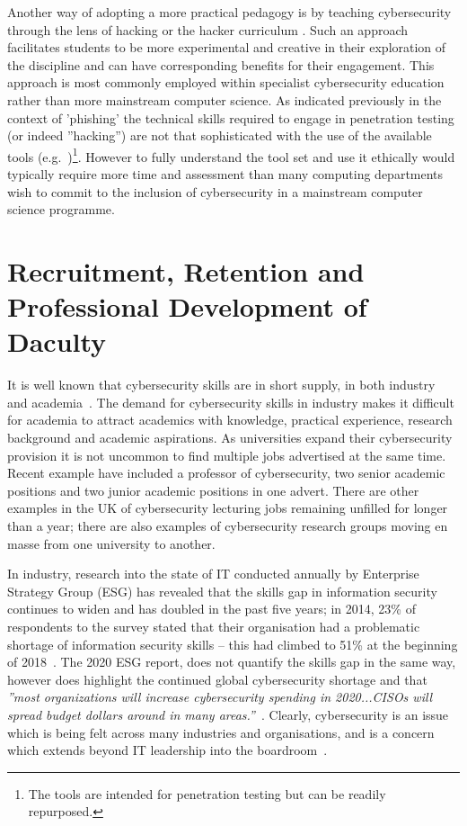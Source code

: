 \documentclass[conference]{IEEEtran}
\begin{document}
Another way of adopting a more practical pedagogy is by teaching
cybersecurity through the lens of hacking or the hacker curriculum
\cite{bratus2010teaching}. Such an approach facilitates students to be
more experimental and creative in their exploration of the discipline
and can have corresponding benefits for their engagement. This
approach is most commonly employed within specialist cybersecurity
education rather than more mainstream computer science. As indicated
previously in the context of 'phishing' the technical skills required
to engage in penetration testing (or indeed ''hacking'') are not that
sophisticated with the use of the available tools
(e.g.~\cite{KaliLinux,metasploit})\footnote{The tools are intended for
penetration testing but can be readily repurposed. }. However to fully
understand the tool set and use it ethically would typically require
more time and assessment than many computing departments wish to
commit to the inclusion of cybersecurity in a mainstream computer
science programme.

\section{Recruitment, Retention and Professional Development of
  Daculty}\label{sec:staff}

It is well known that cybersecurity skills are in short supply, in
both industry~\cite{Ackerman2019a} and
academia~\cite{schneider2013,endicott2018searching}. The demand for
cybersecurity skills in industry makes it difficult for academia to
attract academics with knowledge, practical experience, research
background and academic aspirations. As universities expand their
cybersecurity provision it is not uncommon to find multiple jobs
advertised at the same time. Recent example have included a professor
of cybersecurity, two senior academic positions and two junior
academic positions in one advert. There are other examples in the UK
of cybersecurity lecturing jobs remaining unfilled for longer than a
year; there are also examples of cybersecurity research groups moving
en masse from one university to another.

In industry,
research into the state of IT conducted annually by Enterprise Strategy Group (ESG) has revealed that the skills gap in information security continues to widen and has doubled in the past five years; in 2014, 23\% of respondents to the survey stated that their organisation had a problematic shortage of information security skills -- this had climbed to 51\% at the beginning of 2018~\cite{ESG:2018}. The 2020 ESG report, does not quantify the skills gap in the same way, however does highlight the continued global cybersecurity shortage and that {\em''most organizations will increase cybersecurity spending in 2020...CISOs will spread budget dollars around in many areas.''}~\cite[p.1]{ESG:2020}. Clearly, cybersecurity is an issue which is being felt across many industries and organisations, and is a concern which extends beyond IT leadership into the boardroom~\cite{Ackerman2019a}.
\end{document}
